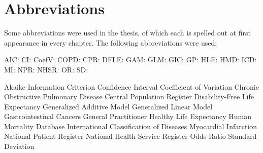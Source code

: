 
\chapter{Abbreviations}

Some abbreviations were used in the thesis, of which 
each is spelled out at first appearance in every chapter. 
The following abbreviations were used:\\

\begin{minipage}{0.15\linewidth}   
AIC:\newline
CI: \newline
CoefV: \newline
COPD: \newline
CPR: \newline
DFLE: \newline
GAM: \newline
GLM: \newline
GIC: \newline
GP: \newline
HLE: \newline
HMD: \newline
ICD: \newline
MI: \newline
NPR: \newline
NHSR: \newline
OR: \newline
SD: \newline
\end{minipage}
\begin{minipage}{0.85\linewidth}
Akaike Information Criterion \newline
Confidence Interval \newline
Coefficient of Variation \newline
Chronic Obstructive Pulmonary Disease \newline
Central Population Register \newline
Disability-Free Life Expectancy \newline
Generalized Additive Model \newline
Generalized Linear Model \newline
Gastrointestinal Cancers \newline
General Practitioner \newline
Healthy Life Expectancy \newline
Human Mortality Database \newline
International Classification of Diseases \newline
Myocardial Infarction \newline
National Patient Register \newline
National Health Service Register \newline
Odds Ratio \newline
Standard Deviation \newline
\end{minipage}




